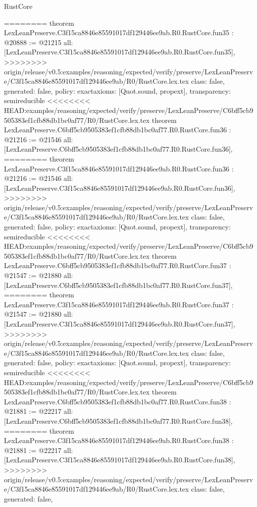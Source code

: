 \begin{lexlean}{RustCore}
\begin{coremodule}
{\begin{coremodule}
{{{{{{{{{{{{{{{{{{{{{{{{{{{{{{{{{{{{{{========
theorem LexLeanPreserve.C3f15ca8846e85591017df129446ee9ab.R0.RustCore.fun35 : @20888 := @21215 {
  all: [LexLeanPreserve.C3f15ca8846e85591017df129446ee9ab.R0.RustCore.fun35],
>>>>>>>> origin/release/v0.5:examples/reasoning/expected/verify/preserve/LexLeanPreserve/C3f15ca8846e85591017df129446ee9ab/R0/RustCore.lex.tex
  class: false,
  generated: false,
  policy: exact{axioms: [Quot.sound, propext]},
  transparency: semireducible
}
<<<<<<<< HEAD:examples/reasoning/expected/verify/preserve/LexLeanPreserve/C6bff5cb9505383ef1cfb88db1bc0af77/R0/RustCore.lex.tex
theorem LexLeanPreserve.C6bff5cb9505383ef1cfb88db1bc0af77.R0.RustCore.fun36 : @21216 := @21546 {
  all: [LexLeanPreserve.C6bff5cb9505383ef1cfb88db1bc0af77.R0.RustCore.fun36],
========
theorem LexLeanPreserve.C3f15ca8846e85591017df129446ee9ab.R0.RustCore.fun36 : @21216 := @21546 {
  all: [LexLeanPreserve.C3f15ca8846e85591017df129446ee9ab.R0.RustCore.fun36],
>>>>>>>> origin/release/v0.5:examples/reasoning/expected/verify/preserve/LexLeanPreserve/C3f15ca8846e85591017df129446ee9ab/R0/RustCore.lex.tex
  class: false,
  generated: false,
  policy: exact{axioms: [Quot.sound, propext]},
  transparency: semireducible
}
<<<<<<<< HEAD:examples/reasoning/expected/verify/preserve/LexLeanPreserve/C6bff5cb9505383ef1cfb88db1bc0af77/R0/RustCore.lex.tex
theorem LexLeanPreserve.C6bff5cb9505383ef1cfb88db1bc0af77.R0.RustCore.fun37 : @21547 := @21880 {
  all: [LexLeanPreserve.C6bff5cb9505383ef1cfb88db1bc0af77.R0.RustCore.fun37],
========
theorem LexLeanPreserve.C3f15ca8846e85591017df129446ee9ab.R0.RustCore.fun37 : @21547 := @21880 {
  all: [LexLeanPreserve.C3f15ca8846e85591017df129446ee9ab.R0.RustCore.fun37],
>>>>>>>> origin/release/v0.5:examples/reasoning/expected/verify/preserve/LexLeanPreserve/C3f15ca8846e85591017df129446ee9ab/R0/RustCore.lex.tex
  class: false,
  generated: false,
  policy: exact{axioms: [Quot.sound, propext]},
  transparency: semireducible
}
<<<<<<<< HEAD:examples/reasoning/expected/verify/preserve/LexLeanPreserve/C6bff5cb9505383ef1cfb88db1bc0af77/R0/RustCore.lex.tex
theorem LexLeanPreserve.C6bff5cb9505383ef1cfb88db1bc0af77.R0.RustCore.fun38 : @21881 := @22217 {
  all: [LexLeanPreserve.C6bff5cb9505383ef1cfb88db1bc0af77.R0.RustCore.fun38],
========
theorem LexLeanPreserve.C3f15ca8846e85591017df129446ee9ab.R0.RustCore.fun38 : @21881 := @22217 {
  all: [LexLeanPreserve.C3f15ca8846e85591017df129446ee9ab.R0.RustCore.fun38],
>>>>>>>> origin/release/v0.5:examples/reasoning/expected/verify/preserve/LexLeanPreserve/C3f15ca8846e85591017df129446ee9ab/R0/RustCore.lex.tex
  class: false,
  generated: false,
}}}}}}}}}}}}}}}}}}}}}}}}}}}}}}}}}}}}}}}}}}
\end{coremodule}}
\end{coremodule}
\end{lexlean}
